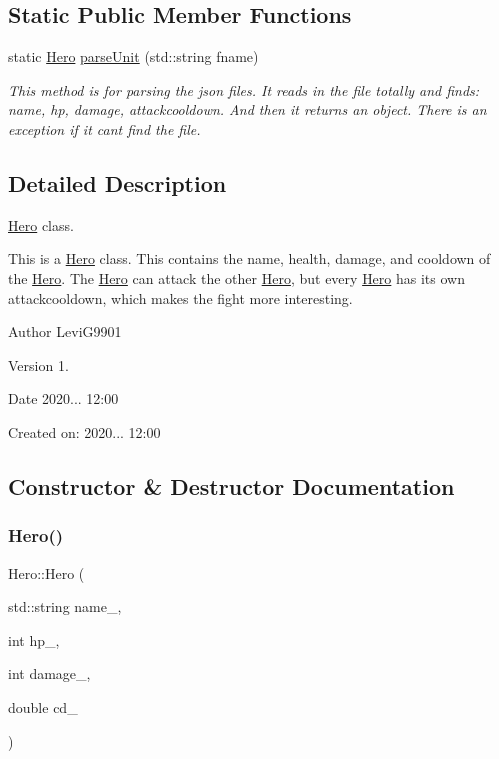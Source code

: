 \subsection*{Static Public Member Functions}
\begin{DoxyCompactItemize}
\item 
static \hyperlink{classHero}{Hero} \hyperlink{classHero_a5a40a729874f0646e5f26027d92a98a1}{parse\+Unit} (std\+::string fname)
\begin{DoxyCompactList}\small\item\em This method is for parsing the json files. It reads in the file totally and finds\+: name, hp, damage, attackcooldown. And then it returns an object. There is an exception if it can\textquotesingle{}t find the file. \end{DoxyCompactList}\end{DoxyCompactItemize}


\subsection{Detailed Description}
\hyperlink{classHero}{Hero} class. 

This is a \hyperlink{classHero}{Hero} class. This contains the name, health, damage, and cooldown of the \hyperlink{classHero}{Hero}. The \hyperlink{classHero}{Hero} can attack the other \hyperlink{classHero}{Hero}, but every \hyperlink{classHero}{Hero} has its own attackcooldown, which makes the fight more interesting.

\begin{DoxyAuthor}{Author}
Levi\+G9901
\end{DoxyAuthor}
\begin{DoxyVersion}{Version}
1.
\end{DoxyVersion}
\begin{DoxyDate}{Date}
2020... 12\+:00
\end{DoxyDate}
Created on\+: 2020... 12\+:00 

\subsection{Constructor \& Destructor Documentation}
\mbox{\label{classHero_a48a41cc569e8a128d8fd027752f699c5}} 
\subsubsection{\texorpdfstring{Hero()}{Hero()}}
{\footnotesize\ttfamily Hero\+::\+Hero (\begin{DoxyParamCaption}\item[{std\+::string}]{name\+\_\+,  }\item[{int}]{hp\+\_\+,  }\item[{int}]{damage\+\_\+,  }\item[{double}]{cd\+\_\+ }\end{DoxyParamCaption})}



